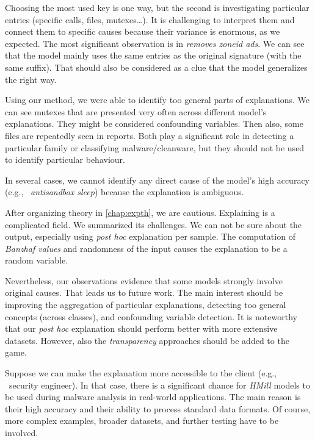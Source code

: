 Choosing the most used key is one way, but the second is investigating particular entries (specific calls, files, mutexes\dots). It is challenging to interpret them and connect them to specific causes because their variance is enormous, as we expected. The most significant observation is in \emph{removes zoneid ads}. We can see that the model mainly uses the same entries as the original signature (with the same suffix). That should also be considered as a clue that the model generalizes the right way.

Using our method, we were able to identify too general parts of explanations. We can see mutexes that are presented very often across different model's explanations. They might be considered confounding variables. Then also, some files are repeatedly seen in reports. Both play a significant role in detecting a particular family or classifying malware/cleanware, but they should not be used to identify particular behaviour.

In several cases, we cannot identify any direct cause of the model's high accuracy (e.g., \ \emph{antisandbox sleep}) because the explanation is ambiguous.

\hfill \break

After organizing theory in \ref{chap:expth}, we are cautious. Explaining is a complicated field. We summarized its challenges. We can not be sure about the output, especially using \emph{post hoc} explanation per sample. The computation of \emph{Banzhaf values} and randomness of the input causes the explanation to be a random variable. 

Nevertheless, our observations evidence that some models strongly involve original causes. That leads us to future work. The main interest should be improving the aggregation of particular explanations, detecting too general concepts (across classes), and confounding variable detection. It is noteworthy that our \emph{post hoc} explanation should perform better with more extensive datasets. However, also the \emph{transparency} approaches should be added to the game. 

Suppose we can make the explanation more accessible to the client (e.g., \ security engineer). In that case, there is a significant chance for \emph{HMill} models to be used during malware analysis in real-world applications. The main reason is their high accuracy and their ability to process standard data formats. Of course, more complex examples, broader datasets, and further testing have to be involved.
